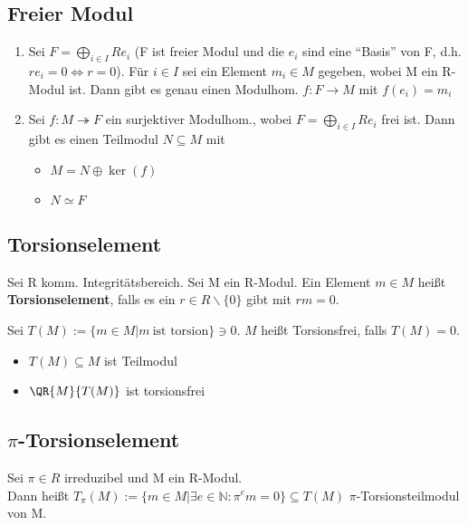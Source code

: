 \subsection{Freier Modul}
\begin{theorem}
\leavevmode
\begin{enumerate}
	\item Sei $F = \bigoplus \limits_{i \in I} R e_i $ (F ist freier Modul und die $e_i$ sind eine \enquote{Basis} von F, d.h. $r e_i = 0 \Leftrightarrow r=0$).
	Für $i\in I$ sei ein Element $m_i \in M$ gegeben, wobei M ein R-Modul ist.
	Dann gibt es genau einen Modulhom. $f:F \rightarrow M $ mit $f(e_i) = m_i$
	\item Sei $f:M \twoheadrightarrow F$ ein surjektiver Modulhom., wobei $F = \bigoplus \limits_{i \in I}R e_i$ frei ist. Dann gibt es einen Teilmodul $N \subseteq M$ mit
	\begin{itemize}
		\item $M = N \oplus \ker(f)$
		\item $N \simeq F$
	\end{itemize}
\end{enumerate}
\end{theorem}

\subsection{Torsionselement}
\begin{definition}
Sei R komm. Integritätsbereich. Sei M ein R-Modul. Ein Element $m\in M$ heißt \textbf{Torsionselement}, falls es ein $r\in R \backslash \{0\}$ gibt mit $rm=0$.

Sei $T(M) := \{m \in M | m~\text{ist torsion} \} \ni 0$. $M$ heißt Torsionsfrei, falls $T(M) = 0$.
\end{definition}

\begin{remark}
\leavevmode
\begin{itemize}
	\item $T(M) \subseteq M$ ist Teilmodul
	\item $\QR{M}{T(M)}$ ist torsionsfrei
\end{itemize}
\end{remark}

\subsection{$\pi$-Torsionselement}
\begin{definition}
Sei $\pi \in R$ irreduzibel und M ein R-Modul.\\
Dann heißt $T_\pi (M):= \{m \in M | \exists e \in \mathbb{N}: \pi^em = 0 \} \subseteq T(M)$ $\pi$-Torsionsteilmodul von M.
\end{definition}

